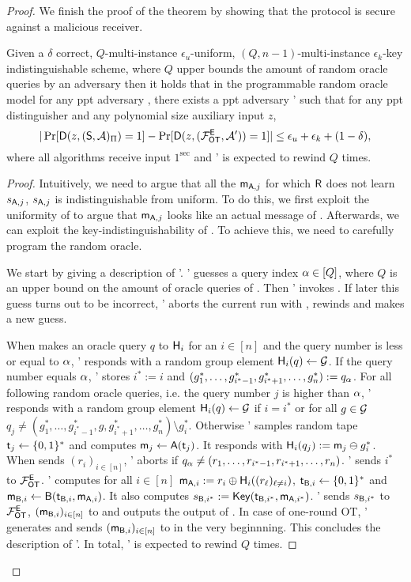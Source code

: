 \begin{proof}
We finish the proof of the theorem by showing that the \OT protocol is secure against a malicious receiver.
\begin{claim}\label{claim:malreceiver}
Given a $\delta$ correct,  $Q$-multi-instance $\epsilon_u$-uniform,  $(Q,n-1)$-multi-instance $\epsilon_k$-key indistinguishable  \UKA scheme, where $Q$ upper bounds the amount of random oracle queries by an adversary then it holds that in the programmable random oracle model for any ppt adversary \Adv, there exists a ppt adversary \Adv' such that for any ppt distinguisher \D and any polynomial size auxiliary input $z$,
$$
|\Pr[\mathsf D(z,(\mathsf{S}, \mathcal{A})_{\Pi})=1] -\Pr[\mathsf D(z,(\mathcal{F}_{\mathsf{OT}}^\mathsf{E},\mathcal{A}'))=1]|\leq \epsilon_{u}+\epsilon_{k}+(1-\delta),
$$
where all algorithms receive input $1^\sec$ and \Adv' is expected to rewind \Adv $Q$ times.
\end{claim}


\begin{proof}
Intuitively, we need to argue that all the $\mathsf{m}_{\mathsf{A},j}$ for which $\mathsf{R}$ does not learn $s_{\mathsf{A},j}$,  $s_{\mathsf{A},j}$ is indistinguishable from uniform. To do this, we first exploit the uniformity of \UKA to argue that $\mathsf{m}_{\mathsf{A},j}$ looks like an actual message of \UKA. Afterwards, we can exploit the key-indistinguishability of \UKA. To achieve this, we need to carefully program the random oracle.

We start by giving a description of \Adv'. \Adv' guesses a query index $\alpha\in[Q]$, where $Q$ is an upper bound on the amount of oracle queries of \Adv. Then \Adv'  invokes \Adv. If later this guess turns out to be incorrect, \Adv' aborts the current run with \Adv, rewinds \Adv and makes a new guess.

When \Adv makes an oracle query $q$ to $\mathsf{H}_i$ for an $i\in[n]$ and the query number is less or equal to $\alpha$, \Adv' responds with a random group element $\mathsf{H}_i(q)\leftarrow\mathcal{G}$. 
If the query number equals $\alpha$, \Adv' stores $i^*:=i$ and $(g^*_1,\dots, g^*_{i^*-1},g^*_{i^*+1},\dots, g^*_{n}):=q_{\alpha}$. 
For all following random oracle queries, i.e. the query number $j$ is higher than $\alpha$, \Adv ' responds with a random group element $\mathsf{H}_i(q)\leftarrow\mathcal{G}$ if $i=i^*$ or for all $g\in\mathcal{G}$ $q_j\neq (g^*_1,\dots, g^*_{i^*-1},g,g^*_{i^*+1},\dots, g^*_{n})\setminus g^*_i$. Otherwise \Adv'   samples random tape $\mathsf{t}_j\leftarrow\{0,1\}^*$ and computes $\mathsf{m}_{j}\leftarrow\mathsf{A}(\mathsf{t}_j)$. 
It responds with $\mathsf{H}_i(q_j):=\mathsf{m}_j\ominus g^*_{i}$. When \Adv sends $(r_i)_{i\in[n]}$, \Adv' aborts if $q_{\alpha}\neq (r_1,\dots, r_{i^*-1},r_{i^*+1},\dots, r_{n})$. \Adv' sends $i^*$ to $\mathcal{F}_{\mathsf{OT}}^\mathsf{E}$. \Adv' computes for all $i\in[n]$ $\mathsf{m}_{\mathsf{A},i}:=r_i\oplus\mathsf{H}_i((r_\ell)_{\ell\neq i})$, $\mathsf{t}_{\mathsf{B},i}\leftarrow\{0,1\}^*$ and $\mathsf{m}_{\mathsf{B},i}\leftarrow\mathsf{B}(\mathsf{t}_{\mathsf{B},i},\mathsf{m}_{\mathsf{A},i})$. It also computes $s_{\mathsf{B},i^*}:=\mathsf{Key}(\mathsf{t}_{\mathsf{B},i^*},\mathsf{m}_{\mathsf{A},i^*})$.
\Adv' sends $s_{\mathsf{B},i^*}$ to $\mathcal{F}_{\mathsf{OT}}^\mathsf{E}$, $(\mathsf{m}_{\mathsf{B},i})_{i\in[n]}$ to \Adv and outputs the output of \Adv. In case of one-round OT, \Adv' generates and sends $(\mathsf{m}_{\mathsf{B},i})_{i\in[n]}$ to \Adv in the very beginnning. This concludes the description of \Adv'. In total, \Adv' is expected to rewind \Adv $Q$ times.


\end{proof}
\end{proof}
